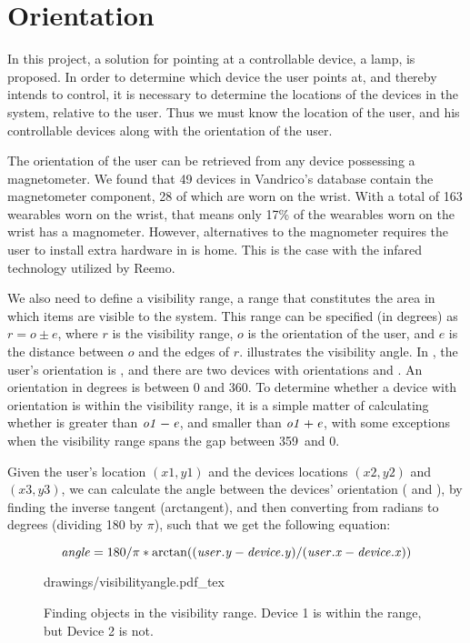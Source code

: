 \section{Orientation}\label{sec:analysis:orientation}
In this project, a solution for pointing at a controllable device, \eg a lamp, is proposed. 
In order to determine which device the user points at, 
and thereby intends to control, 
it is necessary to determine the locations of the devices in the system, 
relative to the user. 
Thus we must know the location of the user, 
and his controllable devices along with the orientation of the user.

The orientation of the user can be retrieved from any device possessing a magnetometer. 
We found that \num{49} devices in Vandrico's database contain the magnetometer component, 28 of which are worn on the wrist.
With a total of 163 wearables worn on the wrist, that means only 17\% of the wearables worn on the wrist has a magnometer. However, alternatives to the magnometer requires the user to install extra hardware in is home. This is the case with the infared technology utilized by Reemo.

We also need to define a visibility range, 
\ie a range that constitutes the area in which items are visible to the system. 
This range can be specified (in degrees) as $r = o \pm e$, 
where $r$ is the visibility range, $o$ is the orientation of the user, 
and $e$ is the distance between $o$ and the edges of $r$.
 illustrates the visibility angle. 
In , the user's orientation is , 
and there are two devices with orientations  and . 
An orientation in degrees is between \num{0} and \num{360}. 
To determine whether a device with orientation  is within the visibility range, 
it is a simple matter of calculating whether  is greater than $\var{o1}-\var{e}$, 
and smaller than $\var{o1}+\var{e}$, 
with some exceptions when the visibility range spans the gap between 359\degree \ and 0\degree.

Given the user's location $(x1, y1)$ and the devices locations $(x2, y2)$ and $(x3, y3)$,
we can calculate the angle between the devices' orientation ( and ), 
by finding the inverse tangent (arctangent), 
and then converting from radians to degrees (dividing \num{180} by $\pi$), 
such that we get the following equation:

\begin{equation}\label{eq:angle}
\var{angle} = 180 / \pi * \arctan((\var{user.y} - \var{device.y}) / (\var{user.x} - \var{device.x}))
\end{equation}

\begin{figure}[!htb]
    \centering
    \def\svgwidth{0.6\textwidth}
    {drawings/visibilityangle.pdf_tex}
    \caption{Finding objects in the visibility range. Device 1 is within the range, but Device 2 is not.}
\label{fig:visibilityangle}
\end{figure}

